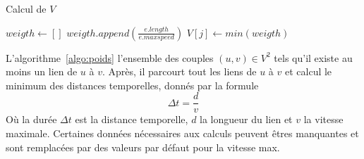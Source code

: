 \begin{algorithm}
\caption{Calcul de $V$}\label{algo:poids}
\begin{algorithmic}
			\State $weigth \gets []$
				\State $weigth.append\left(\frac{e.length}{e.maxspeed}\right)$
			\EndFor
			\State $V[j]\gets min(weigth)$
		\EndFor
	\EndFor
\end{algorithmic}
\end{algorithm}

L'algorithme~\ref{algo:poids} l'ensemble des couples $(u,v)\in V^2$ tels qu'il existe au moins un lien de $u$ à $v$. %
	Après, il parcourt tout les liens de $u$ à $v$ et calcul le minimum des distances temporelles, donnés par la formule
	\[\Delta t=\frac{d}{v}\]
	Où la durée $\Delta t$ est la distance temporelle, $d$ la longueur du lien et $v$ la vitesse maximale.
Certaines données nécessaires aux calculs peuvent êtres manquantes et sont remplacées par des valeurs par défaut pour la vitesse max. %